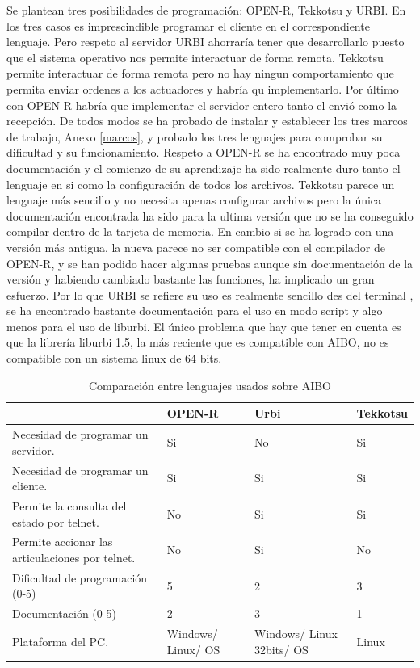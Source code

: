 \documentclass[12pt,a4paper,final,twoside]{article}
\begin{document}
Se plantean tres posibilidades de programación: OPEN-R, Tekkotsu y URBI.
En los tres casos es imprescindible programar el cliente en el correspondiente lenguaje. Pero respeto al servidor URBI ahorraría tener que desarrollarlo puesto que el sistema operativo nos permite interactuar de forma remota. Tekkotsu permite interactuar de forma remota pero no hay ningun comportamiento que permita enviar ordenes a los actuadores y habría qu implementarlo. Por último con OPEN-R habría que implementar el servidor entero tanto el envió como la recepción. 
De todos modos se ha probado de instalar y establecer los tres marcos de trabajo, Anexo \ref{marcos}, y probado los tres lenguajes para comprobar su dificultad y su funcionamiento. Respeto a OPEN-R se ha encontrado muy poca documentación y el comienzo de su aprendizaje ha sido realmente duro tanto el lenguaje en si como la configuración de todos los archivos. Tekkotsu parece un lenguaje más sencillo y no necesita apenas configurar archivos pero la única documentación encontrada ha sido para la ultima versión que no se ha conseguido compilar dentro de la tarjeta de memoria. En cambio si se ha logrado con una versión más antigua, la nueva parece no ser compatible con el compilador de OPEN-R, y se han podido hacer algunas pruebas aunque sin documentación de la versión y habiendo cambiado bastante las funciones, ha implicado un gran esfuerzo. 
Por lo que URBI se refiere su uso es realmente sencillo des del terminal , se ha encontrado bastante documentación para el uso en modo script y algo menos para el uso de liburbi. El único problema que hay que tener en cuenta es que la librería liburbi 1.5, la más reciente que es compatible con  AIBO, no es compatible con un sistema linux de 64 bits. 

\begin{table}[H]
\begin{center}
\begin{tabulary}{\textwidth}{|p{5cm}|p{2.5cm}|p{2.5cm}|p{2.5cm}|}
\hline

& \textbf{OPEN-R}
& \textbf{Urbi} 
& \textbf{Tekkotsu} \\\hline
Necesidad de programar un servidor.
& Si
& No
& Si \\ \hline
Necesidad de programar un cliente.
& Si
& Si
& Si\\ \hline
Permite la consulta del estado por telnet.
& No
& Si
& Si\\ \hline
Permite accionar las articulaciones por telnet.
& No
& Si
& No\\ \hline
Dificultad de programación (0-5)
& 5
& 2 
& 3\\ \hline
Documentación (0-5)
& 2
& 3
& 1\\ \hline
Plataforma del PC.
& Windows/ Linux/ OS
& Windows/ Linux 32bits/ OS
& Linux\\ \hline
\end{tabulary}
\end{center}
\caption{Comparación entre lenguajes usados sobre AIBO\label{complleng}}
\end{table}
\end{document}
